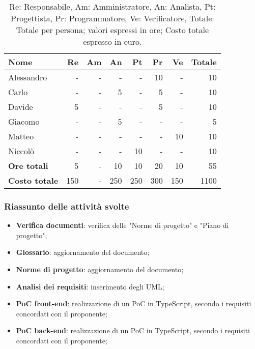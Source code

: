 \begin{table}[H]
	\centering
	\begin{tabular}{l|r|r|r|r|r|r|r}
		\textbf{Nome}         & \textbf{Re} & \textbf{Am} & \textbf{An} & \textbf{Pt} & \textbf{Pr} & \textbf{Ve} & \textbf{Totale} \\
		\hline
		Alessandro            & -           & -           & -           & -           & 10          & -           & 10              \\
		Carlo                 & -           & -           & 5           & -           & 5           & -           & 10              \\
		Davide                & 5           & -           & -           & -           & 5           & -           & 10              \\
		Giacomo               & -           & -           & 5           & -           & -           & -           & 5               \\
		Matteo                & -           & -           & -           & -           & -           & 10          & 10              \\
		Niccolò               & -           & -           & -           & 10          & -           & -           & 10              \\
		\hline
		\textbf{Ore totali}   & 5           & -           & 10          & 10          & 20          & 10          & 55              \\
		\textbf{Costo totale} & 150         & -           & 250         & 250         & 300         & 150         & 1100
	\end{tabular}
	\caption{Re: Responsabile, Am: Amministratore, An: Analista, Pt: Progettista,
		Pr: Programmatore, Ve: Verificatore, Totale: Totale per persona; valori espressi in ore; Costo totale espresso in euro.}
\end{table}

\subsubsection{Riassunto delle attività svolte}

\begin{itemize}
	\item \textbf{Verifica documenti}: verifica delle "Norme di progetto" e
	      "Piano di progetto";

	\item \textbf{Glossario}: aggiornamento del documento;

	\item \textbf{Norme di progetto}: aggiornamento del documento;

	\item \textbf{Analisi dei requisiti}: inserimento degli UML;

	\item \textbf{PoC front-end}: realizzazione di un PoC in TypeScript, secondo
	      i requisiti concordati con il proponente;

	\item \textbf{PoC back-end}: realizzazione di un PoC in TypeScript, secondo
	      i requisiti concordati con il proponente;
\end{itemize}

